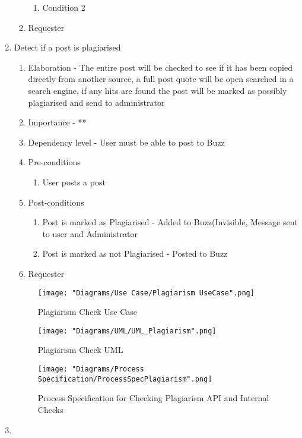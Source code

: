 \documentclass[12pt]{article}
\begin{document}
\begin{enumerate}
\begin{enumerate}
\begin{enumerate}
    	\item Condition 2
    \end{enumerate}
    \item Requester
  \end{enumerate}
\newpage %
   \item Detect if a post is plagiarised  %
  \begin{enumerate}
    \item Elaboration - The entire post will be checked to see if it has been copied directly from another source, a full post quote will be open searched in a search engine, if any hits are found the post will be marked as possibly plagiarised and send to administrator
    \item Importance - **
    \item Dependency level - User must be able to post to Buzz
    \item Pre-conditions
    \begin{enumerate}
    	\item User posts a post
    \end{enumerate}
        \item Post-conditions
    \begin{enumerate}
    	\item Post is marked as Plagiarised - Added to Buzz(Invisible, Message sent to user and Administrator
    	\item Post is marked as not Plagiarised - Posted to Buzz
    \end{enumerate}
    \item Requester
  \end{enumerate}
\begin{figure}[h]
	\centering
	\texttt{[image: "Diagrams/Use Case/Plagiarism UseCase".png]}
	\caption{Plagiarism Check Use Case}
\end{figure}
\begin{figure}[h]
	\centering
	\texttt{[image: "Diagrams/UML/UML\_Plagiarism".png]}
	\caption{Plagiarism Check UML}
\end{figure}
\begin{figure}[h]
	\centering
	\texttt{[image: "Diagrams/Process Specification/ProcessSpecPlagiarism".png]}
	\caption{Process Specification for Checking Plagiarism API and Internal Checks}
\end{figure}
\newpage %
   \item  %

\end{enumerate}
\end{document}
